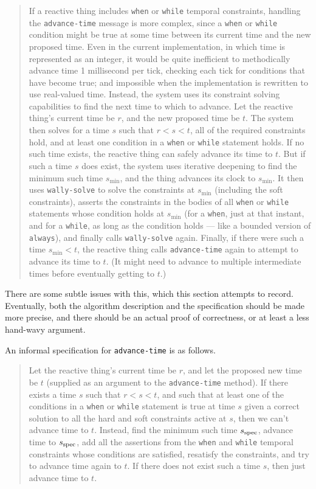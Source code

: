 \documentclass{article}
\begin{document}
\begin{quotation}
If a reactive thing includes \verb|when| or \verb|while| temporal
constraints, handling the \verb|advance-time| message is more complex,
since a \verb|when| or \verb|while| condition might be true at some
time between its current time and the new proposed time.  Even in the
current implementation, in which time is represented as an integer, it
would be quite inefficient to methodically advance time 1 millisecond
per tick, checking each tick for conditions that have become true; and
impossible when the implementation is rewritten to use real-valued
time.  Instead, the system uses its constraint solving capabilities to
find the next time to which to advance.  Let the reactive thing's
current time be $r$, and the new proposed time be $t$\@.  The system
then solves for a time $s$ such that $r<s<t$, all of the required
constraints hold, and at least one condition in a \verb|when| or
\verb|while| statement holds.  If no such time exists, the reactive
thing can safely advance its time to $t$\@.  But if such a time $s$
does exist, the system uses iterative deepening to find the minimum
such time $s_{\min}$, and the thing advances its clock to $s_{\min}$.
It then uses \verb|wally-solve| to solve the constraints at $s_{\min}$
(including the soft constraints), asserts the constraints in the
bodies of all \verb|when| or \verb|while| statements whose condition
holds at $s_{\min}$ (for a \verb|when|, just at that instant, and for
a \verb|while|, as long as the condition holds --- like a bounded
version of \verb|always|), and finally calls \verb|wally-solve| again.
Finally, if there were such a time $s_{\min}<t$, the reactive thing
calls \verb|advance-time| again to attempt to advance its time to $t$\@.
(It might need to advance to multiple intermediate times before
eventually getting to $t$.)
\end{quotation}

There are some subtle issues with this, which this section attempts to
record.  Eventually, both the algorithm description and the
specification should be made more precise, and there should be an
actual proof of correctness, or at least a less hand-wavy argument.

An informal specification for \verb|advance-time| is as follows. 

\begin{quotation}
Let the reactive thing's current time be $r$, and let the proposed new
time be $t$ (supplied as an argument to the \verb|advance-time|
method).  If there exists a time $s$ such that $r<s<t$, and such that
at least one of the conditions in a \verb|when| or \verb|while|
statement is true at time $s$ given a correct solution to all the hard
and soft constraints active at $s$, then we can't advance time to $t$\@.
Instead, find the minimum such time $s_{\rm spec}$, advance time to
$s_{\rm spec}$, add all the assertions from the \verb|when| and
\verb|while| temporal constraints whose conditions are satisfied,
resatisfy the constraints, and try to advance time again to $t$.  If
there does not exist such a time $s$, then just advance time to $t$.
\end{quotation}
\end{document}

